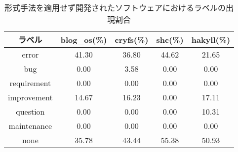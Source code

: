 \begin{table}[p] %
	\centering
	\caption{形式手法を適用せず開発されたソフトウェアにおけるラベルの出現割合}
	\label{tab:discussion_common}
	\begin{tabular}{ccccc} %
		\hline
		ラベル      & blog\_os(\%) & cryfs(\%) & shc(\%) & hakyll(\%) \\\hline
		error       & 41.30        & 36.80     & 44.62   & 21.65      \\
		bug         & 0.00         & 3.58      & 0.00    & 0.00       \\
		requirement & 0.00         & 0.00      & 0.00    & 0.00       \\
		improvement & 14.67        & 16.23     & 0.00    & 17.11      \\
		question    & 0.00         & 0.00      & 0.00    & 10.31      \\
		maintenance & 0.00         & 0.00      & 0.00    & 0.00       \\
		none        & 35.78        & 43.44     & 55.38   & 50.93      \\\hline
	\end{tabular}
\end{table}



